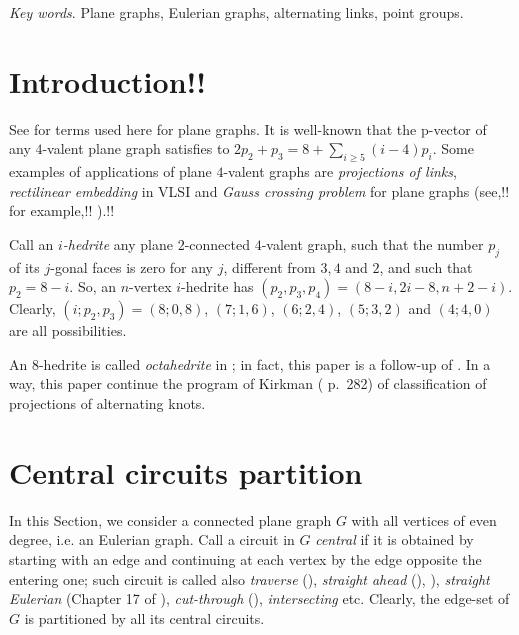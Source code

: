 \documentclass[12pt]{article}
\begin{document}
{\em Key words}. Plane graphs, Eulerian graphs, alternating links, point groups.

\section{Introduction!!}

See \cite{Gr} for terms used here for plane graphs.
It is well-known that the p-vector of any $4$-valent plane graph satisfies to
$2p_2+p_3=8+ \sum_{i\geq 5} (i-4)p_i$.
Some examples of applications of plane $4$-valent graphs are {\em projections
of links}, {\em rectilinear embedding} in VLSI and {\em Gauss crossing 
problem} for plane graphs (see,!! for example,!! \cite{Liu}).!!

\vspace{2mm}


Call an {\em $i$-hedrite} any plane $2$-connected
$4$-valent graph, such that the number
$p_j$ of its $j$-gonal faces is zero for any $j$, different from 
$3,4$ and $2$, and such that $p_2=8-i$. So, 
an $n$-vertex $i$-hedrite has $(p_2, p_3, p_4)=(8-i, 2i-8, n+2-i)$.
Clearly, $(i;p_2,p_3)=(8;0,8)$, $(7;1,6)$, $(6;2,4)$,
$(5;3,2)$ and $(4;4,0)$ are all possibilities. 

An $8$-hedrite is called {\em octahedrite} in \cite{DSt}; in fact, this paper is a follow-up of \cite{DSt}.
In a way, this paper continue the program of Kirkman (\cite{Kirk} p.~282) of classification of projections of alternating knots.


















\section{Central circuits partition}

In this Section, we consider a connected plane graph $G$ with all vertices of 
even degree, i.e. an Eulerian graph. 
Call a circuit in $G$ {\it central} if it is obtained by starting with an
edge and continuing at each vertex by the edge opposite the entering one; such 
circuit is called also {\em traverse} 
(\cite{GK}), {\em straight ahead} (\cite{Ha}),  \cite{PTZ}), 
{\em straight Eulerian} (Chapter 17 of \cite{God}), 
{\em cut-through} (\cite{Je}),
{\em intersecting} etc. Clearly, the edge-set of 
$G$ is partitioned by all its central circuits.
\end{document}
